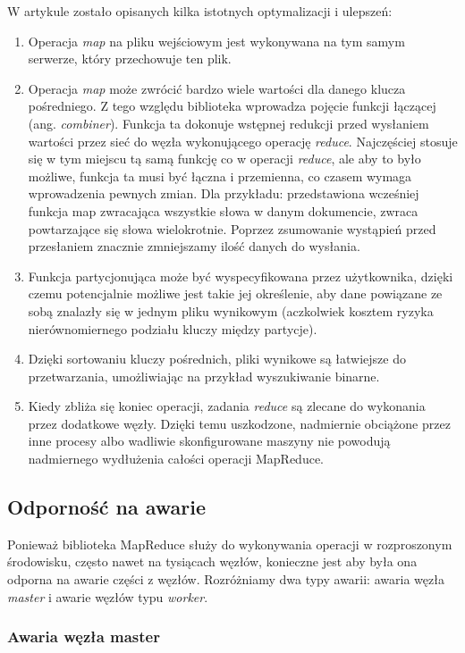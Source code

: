 W artykule \cite{google-mapreduce} zostało opisanych kilka istotnych optymalizacji i ulepszeń:

\begin{enumerate}
 \item Operacja \emph{map} na pliku wejściowym jest wykonywana na tym samym serwerze, który przechowuje ten plik.
 \item Operacja \emph{map} może zwrócić bardzo wiele wartości dla danego klucza pośredniego.
 Z tego względu biblioteka wprowadza pojęcie funkcji łączącej (ang. \emph{combiner}).
 Funkcja ta dokonuje wstępnej redukcji przed wysłaniem wartości przez sieć do węzła wykonującego operację \emph{reduce}.
 Najczęściej stosuje się w tym miejscu tą samą funkcję co w operacji \emph{reduce}, ale aby to było możliwe, funkcja ta musi być łączna i przemienna, co czasem wymaga wprowadzenia pewnych zmian.
 Dla przykładu: przedstawiona wcześniej funkcja map zwracająca wszystkie słowa w danym dokumencie, zwraca powtarzające się słowa wielokrotnie.
 Poprzez zsumowanie wystąpień przed przesłaniem znacznie zmniejszamy ilość danych do wysłania.
 \item Funkcja partycjonująca może być wyspecyfikowana przez użytkownika, dzięki czemu potencjalnie możliwe jest takie jej określenie, aby dane powiązane ze sobą znalazły się w jednym pliku wynikowym (aczkolwiek kosztem ryzyka nierównomiernego podziału kluczy między partycje).
 \item Dzięki sortowaniu kluczy pośrednich, pliki wynikowe są łatwiejsze do przetwarzania, umożliwiając na przykład wyszukiwanie binarne.
 \item Kiedy zbliża się koniec operacji, zadania \emph{reduce} są zlecane do wykonania przez dodatkowe węzły.
 Dzięki temu uszkodzone, nadmiernie obciążone przez inne procesy albo wadliwie skonfigurowane maszyny nie powodują nadmiernego wydłużenia całości operacji MapReduce.
\end{enumerate}

\subsection*{Odporność na awarie}

Ponieważ biblioteka MapReduce służy do wykonywania operacji w rozproszonym środowisku, często nawet na tysiącach węzłów, konieczne jest aby była ona odporna na awarie części z węzłów.
Rozróżniamy dwa typy awarii: awaria węzła \emph{master} i awarie węzłów typu \emph{worker}.

\subsubsection*{Awaria węzła master}

